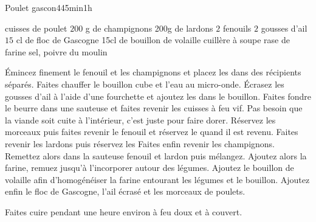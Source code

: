 {\begin{recette}{Poulet gascon}{4}{45min}{1h}
\begin{ingredients}
 cuisses de poulet
\ingredient $200$ g de champignons
\ingredient 200g de lardons
\ingredient $2$ fenouils
\ingredient $2$ gousses d'ail
\ingredient $15$ cl de floc de Gascogne
\ingredient 15cl de bouillon de volaille
 cuillère à soupe rase de farine
\ingredient sel, poivre du moulin
\end{ingredients}

\begin{preparation}
\etape Émincez finement le fenouil et les champignons et placez les dans des récipients séparés.
\etape Faites chauffer le bouillon cube et l'eau au micro-onde. Écrasez les gousses d'ail à l'aide d'une fourchette et ajoutez 
les dans le bouillon.
\etape Faites fondre le beurre dans une sauteuse et faites revenir les cuisses à feu vif. Pas besoin que la viande soit cuite à 
l'intérieur, c'est juste pour faire dorer.
\etape Réservez les morceaux puis faites revenir le fenouil et réservez le quand il est revenu.
\etape Faites revenir les lardons puis réservez les
\etape Faites enfin revenir les champignons.
\etape Remettez alors dans la sauteuse fenouil et lardon puis mélangez.
\etape Ajoutez alors la farine, remuez jusqu'à l'incorporer autour des légumes.
\etape Ajoutez le bouillon de volaille afin d'homogénéiser la farine entourant les légumes et le bouillon.
\etape Ajoutez enfin le floc de Gascogne, l'ail écrasé et les morceaux de poulets.
\end{preparation}

\begin{cuisson}
Faites cuire pendant une heure environ à feu doux et à couvert.
\end{cuisson}
\end{recette}

}
